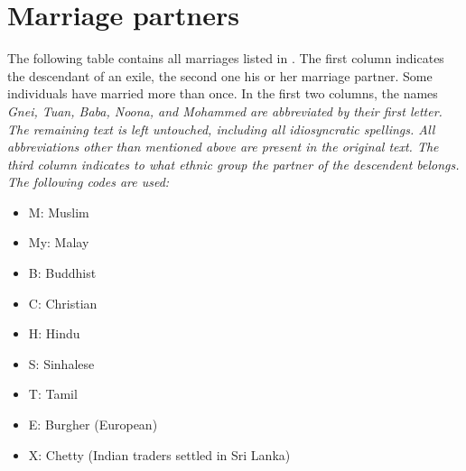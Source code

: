 \chapter{Marriage partners}\label{sec:marriages}
The following table contains all marriages listed in \citet{ArfinBurah}. The first column indicates the descendant of an exile, the second one his or her marriage partner. Some individuals have married more than once. In the first two columns, the names \em Gnei, Tuan, Baba, Noona, \em and \em Mohammed \em are abbreviated by their first letter. The remaining text is left untouched, including all idiosyncratic spellings. All abbreviations other than mentioned above are present in the original text.  The third column indicates to what ethnic group the partner of the descendent belongs. The following codes are used:

\begin{itemize}
 \item M: Muslim
 \item My: Malay
 \item B: Buddhist
 \item C: Christian
 \item H: Hindu
 \item S: Sinhalese
 \item T: Tamil
 \item E: Burgher (European)
 \item X: Chetty (Indian traders settled in Sri Lanka)
\end{itemize}


